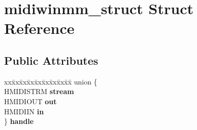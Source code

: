 \hypertarget{structmidiwinmm__struct}{}\section{midiwinmm\+\_\+struct Struct Reference}
\label{structmidiwinmm__struct}
\subsection*{Public Attributes}
\begin{DoxyCompactItemize}
\item 
\mbox{\label{structmidiwinmm__struct_abac08c5b507a41b0c813110e6a08ee20}} 
\begin{tabbing}
xx\=xx\=xx\=xx\=xx\=xx\=xx\=xx\=xx\=\kill
union \{\\
\>HMIDISTRM {\bfseries stream}\\
\>HMIDIOUT {\bfseries out}\\
\>HMIDIIN {\bfseries in}\\
\} {\bfseries handle}\\


\end{tabbing}
\end{DoxyCompactItemize}
